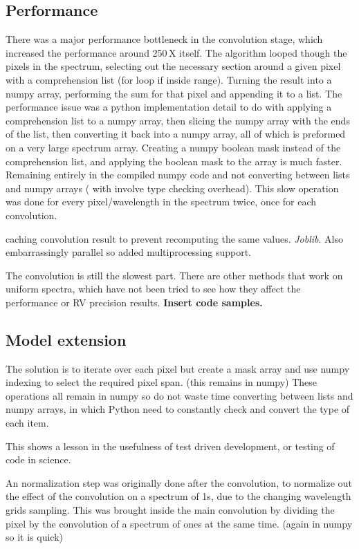  \subsection{Performance}
 \label{subsection:code_performance}
    There was a major performance bottleneck in the convolution stage, which increased the performance around 250\,X itself.
    The algorithm looped though the pixels in the spectrum, selecting out the necessary section around a given pixel with a comprehension list (for loop if inside range).
    Turning the result into a numpy array, performing the sum for that pixel and appending it to a list.
The performance issue was a python implementation detail to do with applying a comprehension list to a numpy array, then slicing the numpy array with the ends of the list, then converting it back into a numpy array, all of which is preformed on a very large spectrum array.
Creating a numpy boolean mask instead of the comprehension list, and applying the boolean mask to the array is much faster. Remaining entirely in the compiled numpy code and not converting between lists and numpy arrays ( with involve type checking overhead).
This slow operation was done for every pixel/wavelength in the spectrum twice, once for each convolution.

caching convolution result to prevent recomputing the same values. \emph{Joblib}.  Also embarrassingly parallel so added multiprocessing support.

The convolution is still the slowest part. There are other methods that work on uniform spectra, which have not been tried to see how they affect the performance or {RV} precision results.
\textbf{Insert code samples.}


\subsection{Model extension}
The solution is to iterate over each pixel but create a mask array and use numpy indexing to select the required pixel span. (this remains in numpy)
These operations all remain in numpy so do not waste time converting between lists and numpy arrays, in which Python need to constantly check and convert the type of each item.

This shows a lesson in the usefulness of test driven development, or testing of code in science.


An normalization step was originally done after the convolution, to normalize out the effect of the convolution on a spectrum of 1s, due to the changing wavelength grids sampling. This was brought inside the main convolution by dividing the pixel by the convolution of a spectrum of ones at the same time. (again in numpy so it is quick)

